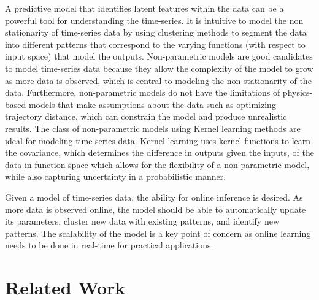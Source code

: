 \documentclass{article}
\begin{document}
A predictive model that identifies latent features within the data can be a powerful tool for understanding the time-series. It is intuitive to model the non stationarity of time-series data by using clustering methods to segment the data into different patterns that correspond to the varying functions (with respect to input space) that model the outputs. Non-parametric models are good candidates to model time-series data because they allow the complexity of the model to grow as more data is observed, which is central to modeling the non-stationarity of the data. Furthermore, non-parametric models do not have the limitations of physics-based models that make assumptions about the data such as optimizing trajectory distance, which can constrain the model and produce unrealistic results. The class of non-parametric models using Kernel learning methods are ideal for modeling time-series data. Kernel learning uses kernel functions to learn the covariance, which determines the difference in outputs given the inputs, of the data in function space which allows for the flexibility of a non-parametric model, while also capturing uncertainty in a probabilistic manner. 

Given a model of time-series data, the ability for online inference is desired. As more data is observed online, the model should be able to automatically update its parameters, cluster new data with existing patterns, and identify new patterns. The scalability of the model is a key point of concern as online learning needs to be done in real-time for practical applications. 

\section{Related Work} 
 
\end{document}
